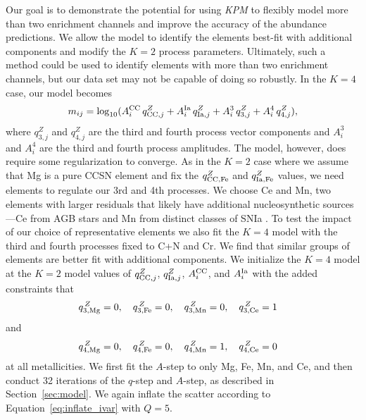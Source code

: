 \documentclass[modern]{aastex631}
\newcommand{\qcc}{q_{{\rm CC,}j}^{Z}}
\newcommand{\qccFe}{q_{{\rm CC, Fe}}^{Z}}
\newcommand{\qIa}{q_{{\rm Ia,}j}^{Z}}
\newcommand{\qIaFe}{q_{{\rm Ia,Fe}}^{Z}}
\newcommand{\Acc}{A^{\rm CC}_{i}}
\newcommand{\AIa}{A^{\rm Ia}_{i}}
\newcommand{\name}{\textsl{KPM}}
\begin{document}
Our goal is to demonstrate the potential for using \name{} to flexibly model more than two enrichment channels and improve the accuracy of the abundance predictions. We allow the model to identify the elements best-fit with additional components and modify the $K=2$ process parameters. Ultimately, such a method could be used to identify elements with more than two enrichment channels, but our data set may not be capable of doing so robustly. In the $K=4$ case, our model becomes
\begin{equation}\label{eq:mij_4}
    m_{ij} = \log_{10}(\Acc\,\qcc + \AIa\,\qIa + A_{i}^{3}\,q_{3, j}^{Z} + A_{i}^{4}\,q_{4, j}^{Z}),
\end{equation}
where $q_{3, j}^{Z}$ and $q_{4, j}^{Z}$ are the third and fourth process vector components and $ A_{i}^3$ and $A_{i}^4$ are the third and fourth process amplitudes. The model, however, does require some regularization to converge. As in the $K=2$ case where we assume that Mg is a pure CCSN element and fix the $\qccFe$ and $\qIaFe$ values, we need elements to regulate our 3rd and 4th processes. We choose Ce and Mn, two elements with larger residuals that likely have additional nucleosynthetic sources---Ce from AGB stars and Mn from distinct classes of SNIa \citep[e.g.][]{gallino1998, reyes2020, gronow2021}. To test the impact of our choice of representative elements we also fit the $K=4$ model with the third and fourth processes fixed to C+N and Cr. We find that similar groups of elements are better fit with additional components. We initialize the $K=4$ model at the $K=2$ model values of $\qcc$, $\qIa$, $\Acc$, and $\AIa$ with the added constraints that 
\begin{equation}\label{eq:q3_z}
    q_{{\rm 3, Mg}}^{\,Z} = 0, \quad 
    q_{{\rm 3, Fe}}^{\,Z} = 0,  \quad 
    q_{{\rm 3, Mn}}^{\,Z} = 0, \quad 
    q_{{\rm 3, Ce}}^{\,Z} = 1 \quad 
\end{equation}
and 
\begin{equation}\label{eq:q4_z}
    q_{{\rm 4, Mg}}^{\,Z} = 0, \quad 
    q_{{\rm 4, Fe}}^{\,Z} = 0,  \quad 
    q_{{\rm 4, Mn}}^{\,Z} = 1, \quad 
    q_{{\rm 4, Ce}}^{\,Z} = 0 \quad 
\end{equation}
at all metallicities. We first fit the $A$-step to only Mg, Fe, Mn, and Ce, and then conduct 32 iterations of the $q$-step and $A$-step, as described in Section~\ref{sec:model}. We again inflate the scatter according to Equation~\ref{eq:inflate_ivar} with $Q=5$. 
\end{document}
